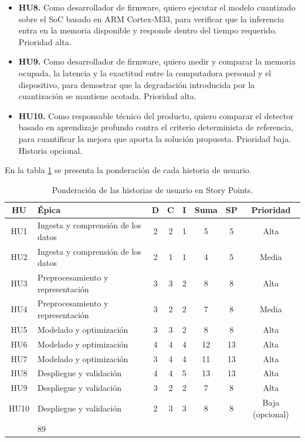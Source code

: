 \documentclass[
11pt, %
]{charter}
\begin{document}
\begin{itemize}
    \item \textbf{HU8.} Como desarrollador de firmware, quiero ejecutar el modelo cuantizado sobre el SoC basado en ARM Cortex-M33, para verificar que la inferencia entra en la memoria disponible y responde dentro del tiempo requerido. Prioridad alta.
    \item \textbf{HU9.} Como desarrollador de firmware, quiero medir y comparar la memoria ocupada, la latencia y la exactitud entre la computadora personal y el dispositivo, para demostrar que la degradación introducida por la cuantización se mantiene acotada. Prioridad alta.
    \item \textbf{HU10.} Como responsable técnico del producto, quiero comparar el detector basado en aprendizaje profundo contra el criterio determinista de referencia, para cuantificar la mejora que aporta la solución propuesta. Prioridad baja. Historia opcional.
\end{itemize}

En la tabla \ref{tab:storypoints} se presenta la ponderación de cada historia de usuario.

\begin{table}[htpb]
\centering
\caption{Ponderación de las historias de usuario en Story Points.}
\label{tab:storypoints}
\begin{tabularx}{\linewidth}{@{}|c|X|c|c|c|c|c|c|@{}}
\hline
\rowcolor[HTML]{C0C0C0}
HU & Épica & D & C & I & Suma & SP & Prioridad \\ \hline
HU1 & Ingesta y comprensión de los datos & 2 & 2 & 1 & 5 & 5 & Alta \\ \hline
HU2 & Ingesta y comprensión de los datos & 2 & 1 & 1 & 4 & 5 & Media \\ \hline
HU3 & Preprocesamiento y representación & 3 & 3 & 2 & 8 & 8 & Alta \\ \hline
HU4 & Preprocesamiento y representación & 3 & 2 & 2 & 7 & 8 & Media \\ \hline
HU5 & Modelado y optimización & 3 & 3 & 2 & 8 & 8 & Alta \\ \hline
HU6 & Modelado y optimización & 4 & 4 & 4 & 12 & 13 & Alta \\ \hline
HU7 & Modelado y optimización & 3 & 4 & 4 & 11 & 13 & Alta \\ \hline
HU8 & Despliegue y validación & 4 & 4 & 5 & 13 & 13 & Alta \\ \hline
HU9 & Despliegue y validación & 3 & 2 & 2 & 7 & 8 & Alta \\ \hline
HU10 & Despliegue y validación & 2 & 3 & 3 & 8 & 8 & Baja (opcional) \\ \hline
\rowcolor[HTML]{EFEFEF}
\multicolumn{6}{|r|}{Total} & 89 & \\ \hline
\end{tabularx}
\end{table}
\else\fi
\end{document}

